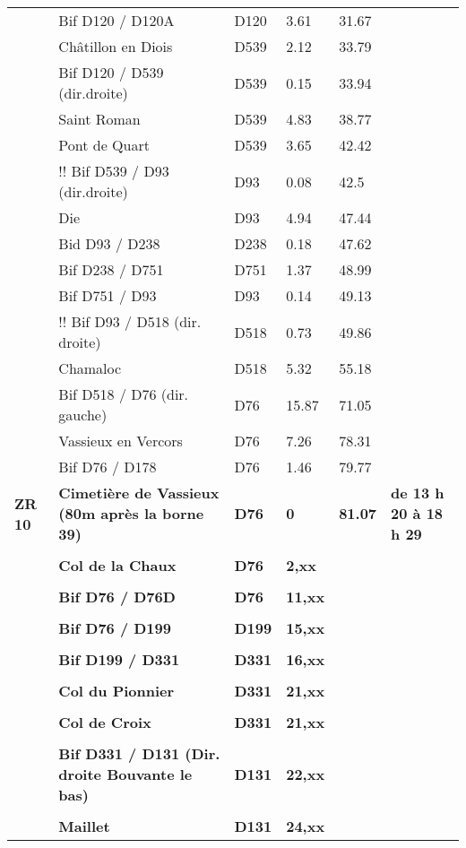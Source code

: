 \documentclass{article}%
\begin{document}
\begin{longtable}{p{2.25cm}|p{7.0cm}|p{1.5cm}|p{1.5cm}|p{1.5cm}|p{3.5cm}}
 &Bif D120 / D120A&D120&3.61&31.67& \\%
 &Châtillon en Diois&D539&2.12&33.79& \\%
 &Bif D120 / D539 (dir.droite)&D539&0.15&33.94& \\%
 &Saint Roman &D539&4.83&38.77& \\%
 &Pont de Quart&D539&3.65&42.42& \\%
 &!! Bif D539 / D93 (dir.droite)&D93&0.08&42.5& \\%
 &Die&D93&4.94&47.44& \\%
 &Bid D93 / D238&D238&0.18&47.62& \\%
 &Bif D238 / D751 &D751&1.37&48.99& \\%
 &Bif D751 / D93&D93&0.14&49.13& \\%
 &!! Bif D93 / D518 (dir. droite)&D518&0.73&49.86& \\%
 &Chamaloc&D518&5.32&55.18& \\%
 &Bif D518 / D76 (dir. gauche)&D76&15.87&71.05& \\%
 &Vassieux en Vercors&D76&7.26&78.31& \\%
 &Bif D76 / D178&D76&1.46&79.77& \\%
\textbf{ ZR 10 }&\textbf{Cimetière de Vassieux (80m après la borne 39)}&\textbf{D76}&\textbf{0}&\textbf{81.07}&\textbf{de 13 h 20 à 18 h 29}\\%
 & & & & & \\%
 &\textbf{Col de la Chaux}&\textbf{D76 }&\textbf{2,xx}& & \\%
 & & & & & \\%
 &\textbf{Bif D76 / D76D}&\textbf{D76}&\textbf{11,xx}& & \\%
 & & & & & \\%
 &\textbf{Bif D76 / D199}&\textbf{D199}&\textbf{15,xx}& & \\%
 & & & & & \\%
 &\textbf{Bif D199 / D331}&\textbf{D331}&\textbf{16,xx}& & \\%
 & & & & & \\%
 &\textbf{Col du Pionnier}&\textbf{D331}&\textbf{21,xx}& & \\%
 & & & & & \\%
 &\textbf{Col de Croix}&\textbf{D331}&\textbf{21,xx}& & \\%
 & & & & & \\%
 &\textbf{Bif D331 / D131 (Dir. droite Bouvante le bas)}&\textbf{D131}&\textbf{22,xx}& & \\%
 & & & & & \\%
 &\textbf{Maillet}&\textbf{D131}&\textbf{24,xx}& & \\%

\end{longtable}
\end{document}

